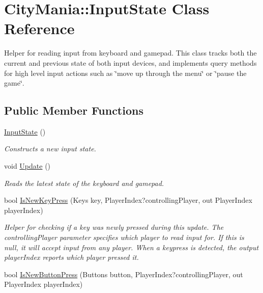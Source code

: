 \hypertarget{classCityMania_1_1InputState}{
\section{CityMania::InputState Class Reference}
\label{classCityMania_1_1InputState}
}


Helper for reading input from keyboard and gamepad. This class tracks both the current and previous state of both input devices, and implements query methods for high level input actions such as \char`\"{}move up through the menu\char`\"{} or \char`\"{}pause the game\char`\"{}.  
\subsection*{Public Member Functions}
\begin{DoxyCompactItemize}
\item 
\hyperlink{classCityMania_1_1InputState_ad3e00d88b010b3907b2bfce4f0da2343}{InputState} ()
\begin{DoxyCompactList}\small\item\em Constructs a new input state. \item\end{DoxyCompactList}\item 
void \hyperlink{classCityMania_1_1InputState_ae691099430d3501cb236c0a7b0d39179}{Update} ()
\begin{DoxyCompactList}\small\item\em Reads the latest state of the keyboard and gamepad. \item\end{DoxyCompactList}\item 
bool \hyperlink{classCityMania_1_1InputState_a97898f622de8b21514a06de7a0b2e141}{IsNewKeyPress} (Keys key, PlayerIndex?controllingPlayer, out PlayerIndex playerIndex)
\begin{DoxyCompactList}\small\item\em Helper for checking if a key was newly pressed during this update. The controllingPlayer parameter specifies which player to read input for. If this is null, it will accept input from any player. When a keypress is detected, the output playerIndex reports which player pressed it. \item\end{DoxyCompactList}\item 
bool \hyperlink{classCityMania_1_1InputState_ab3a3190e6785283cc286d86659957f61}{IsNewButtonPress} (Buttons button, PlayerIndex?controllingPlayer, out PlayerIndex playerIndex)

\end{DoxyCompactItemize}
